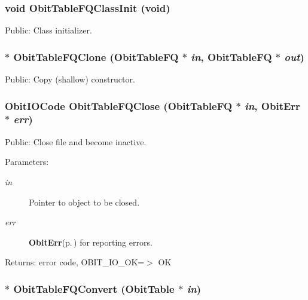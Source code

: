 \subsubsection{\setlength{\rightskip}{0pt plus 5cm}void Obit\-Table\-FQClass\-Init (void)}\label{ObitTableFQ_8h_a10}


Public: Class initializer. 

\subsubsection{$\ast$ Obit\-Table\-FQClone ({\bf Obit\-Table\-FQ} $\ast$ {\em in}, {\bf Obit\-Table\-FQ} $\ast$ {\em out})}\label{ObitTableFQ_8h_a15}


Public: Copy (shallow) constructor. 

\subsubsection{\setlength{\rightskip}{0pt plus 5cm}Obit\-IOCode Obit\-Table\-FQClose ({\bf Obit\-Table\-FQ} $\ast$ {\em in}, {\bf Obit\-Err} $\ast$ {\em err})}\label{ObitTableFQ_8h_a21}


Public: Close file and become inactive. 

\begin{Desc}
\item[Parameters:]
\begin{description}
\item[{\em in}]Pointer to object to be closed. \item[{\em err}]{\bf Obit\-Err}{\rm (p.\,\pageref{structObitErr})} for reporting errors. \end{description}
\end{Desc}
\begin{Desc}
\item[Returns:]error code, OBIT\_\-IO\_\-OK=$>$ OK \end{Desc}
\subsubsection{$\ast$ Obit\-Table\-FQConvert ({\bf Obit\-Table} $\ast$ {\em in})}\label{ObitTableFQ_8h_a16}


